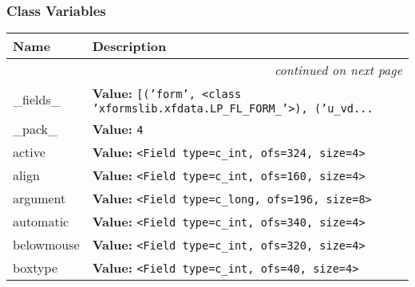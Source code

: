 
  \subsubsection{Class Variables}

    \vspace{-1cm}
\hspace{\varindent}\begin{longtable}{|p{\varnamewidth}|p{\vardescrwidth}|l}
\cline{1-2}
\cline{1-2} \centering \textbf{Name} & \centering \textbf{Description}& \\
\cline{1-2}
\endhead\cline{1-2}\multicolumn{3}{r}{\small\textit{continued on next page}}\\\endfoot\cline{1-2}
\endlastfoot\raggedright \_\-f\-i\-e\-l\-d\-s\-\_\- & \raggedright \textbf{Value:} 
{\tt \texttt{[}\texttt{(}\texttt{'}\texttt{form}\texttt{'}\texttt{, }{\textless}class 'xformslib.xfdata.LP\_FL\_FORM\_'{\textgreater}\texttt{)}\texttt{, }\texttt{(}\texttt{'}\texttt{u\_vd}\texttt{...}}&\\
\cline{1-2}
\raggedright \_\-p\-a\-c\-k\-\_\- & \raggedright \textbf{Value:} 
{\tt 4}&\\
\cline{1-2}
\raggedright a\-c\-t\-i\-v\-e\- & \raggedright \textbf{Value:} 
{\tt {\textless}Field type=c\_int, ofs=324, size=4{\textgreater}}&\\
\cline{1-2}
\raggedright a\-l\-i\-g\-n\- & \raggedright \textbf{Value:} 
{\tt {\textless}Field type=c\_int, ofs=160, size=4{\textgreater}}&\\
\cline{1-2}
\raggedright a\-r\-g\-u\-m\-e\-n\-t\- & \raggedright \textbf{Value:} 
{\tt {\textless}Field type=c\_long, ofs=196, size=8{\textgreater}}&\\
\cline{1-2}
\raggedright a\-u\-t\-o\-m\-a\-t\-i\-c\- & \raggedright \textbf{Value:} 
{\tt {\textless}Field type=c\_int, ofs=340, size=4{\textgreater}}&\\
\cline{1-2}
\raggedright b\-e\-l\-o\-w\-m\-o\-u\-s\-e\- & \raggedright \textbf{Value:} 
{\tt {\textless}Field type=c\_int, ofs=320, size=4{\textgreater}}&\\
\cline{1-2}
\raggedright b\-o\-x\-t\-y\-p\-e\- & \raggedright \textbf{Value:} 
{\tt {\textless}Field type=c\_int, ofs=40, size=4{\textgreater}}&\\
\cline{1-2}

\end{longtable}
